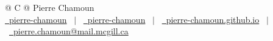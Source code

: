 \begin{tabularx}{\linewidth}{@{} C @{}}
\Huge{Pierre Chamoun} \\[7.5pt]
\href{https://github.com/pierre-chamoun}{\raisebox{-0.05\height}\faGithub\ pierre-chamoun} \ $|$ \
\href{https://linkedin.com/in/pierre-chamoun}{\raisebox{-0.05\height}\faLinkedin\ pierre-chamoun} \ $|$ \
\href{https://pierre-chamoun.github.io}{\raisebox{-0.05\height}\faGlobe \ pierre-chamoun.github.io} \ $|$ \
\href{mailto:pierre.chamoun@mail.mcgill.ca}{\raisebox{-0.05\height}\faEnvelope \ pierre.chamoun@mail.mcgill.ca} \\
\end{tabularx}

